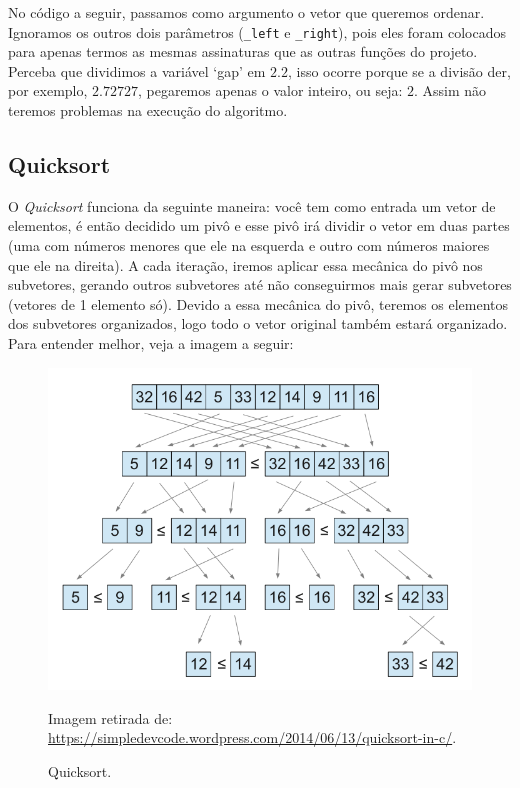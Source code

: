 No código a seguir, passamos como argumento o vetor que queremos ordenar. Ignoramos os outros dois parâmetros (\texttt{\_left} e \texttt{\_right}), pois eles foram colocados para apenas termos as mesmas assinaturas que as outras funções do projeto. Perceba que dividimos a variável `gap' em $2.2$, isso ocorre porque se a divisão der, por exemplo, $2.72727$, pegaremos apenas o valor inteiro, ou seja: $2$. Assim não teremos problemas na execução do algoritmo.



\subsection{Quicksort}
O \textit{Quicksort} funciona da seguinte maneira: você tem como entrada um vetor de elementos, é então decidido um pivô e esse pivô irá dividir o vetor em duas partes (uma com números menores que ele na esquerda e outro com números maiores que ele na direita). A cada iteração, iremos aplicar essa mecânica do pivô nos subvetores, gerando outros subvetores até não conseguirmos mais gerar subvetores (vetores de 1 elemento só). Devido a essa mecânica do pivô, teremos os elementos dos subvetores organizados, logo todo o vetor original também estará organizado. Para entender melhor, veja a imagem a seguir:

\begin{figure}[H]
	\centering
	\includegraphics[scale=0.4]{img/quicksort.png}
	\caption{Quicksort.}
	\small{Imagem retirada de: \url{https://simpledevcode.wordpress.com/2014/06/13/quicksort-in-c/}.}
	\label{quicksort}
\end{figure}

